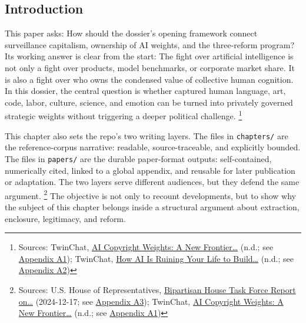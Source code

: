 \documentclass[
  american,
  11pt,
  letterpaper,
]{article}
\begin{document}
\subsection{Introduction}\label{introduction}

This paper asks: How should the dossier's opening framework connect
surveillance capitalism, ownership of AI weights, and the three-reform
program? Its working answer is clear from the start: The fight over
artificial intelligence is not only a fight over products, model
benchmarks, or corporate market share. It is also a fight over who owns
the condensed value of collective human cognition. In this dossier, the
central question is whether captured human language, art, code, labor,
culture, science, and emotion can be turned into privately governed
strategic weights without triggering a deeper political challenge.
\footnote{Sources: TwinChat,
  \href{https://medium.com/twinchat/ai-copyright-weights-a-new-frontier-in-intellectual-property-law-d8ee1b6c55ee}{AI
  Copyright Weights: A New Frontier\ldots{}} (n.d.; see
  \hyperref[ch-00-appendix-a1-ai-copyright-weights-a-new-frontier-in-intellectual-property-law]{Appendix
  A1}); TwinChat,
  \href{https://medium.com/twinchat/how-ai-is-ruining-your-life-to-build-an-empire-8b6d02e55bc9}{How
  AI Is Ruining Your Life to Build\ldots{}} (n.d.; see
  \hyperref[ch-00-appendix-a2-how-ai-is-ruining-your-life-to-build-an-empire]{Appendix
  A2})}

This chapter also sets the repo's two writing layers. The files in
\texttt{chapters/} are the reference-corpus narrative: readable,
source-traceable, and explicitly bounded. The files in \texttt{papers/}
are the durable paper-format outputs: self-contained, numerically cited,
linked to a global appendix, and reusable for later publication or
adaptation. The two layers serve different audiences, but they defend
the same argument. \footnote{Sources: U.S. House of Representatives,
  \href{https://www.speaker.gov/wp-content/uploads/2024/12/AI-Task-Force-Report-FINAL.pdf}{Bipartisan
  House Task Force Report on\ldots{}} (2024-12-17; see
  \hyperref[ch-00-appendix-a3-bipartisan-house-task-force-report-on-artificial-intelligence]{Appendix
  A3}); TwinChat,
  \href{https://medium.com/twinchat/ai-copyright-weights-a-new-frontier-in-intellectual-property-law-d8ee1b6c55ee}{AI
  Copyright Weights: A New Frontier\ldots{}} (n.d.; see
  \hyperref[ch-00-appendix-a1-ai-copyright-weights-a-new-frontier-in-intellectual-property-law]{Appendix
  A1})} The objective is not only to recount developments, but to show
why the subject of this chapter belongs inside a structural argument
about extraction, enclosure, legitimacy, and reform.
\end{document}
